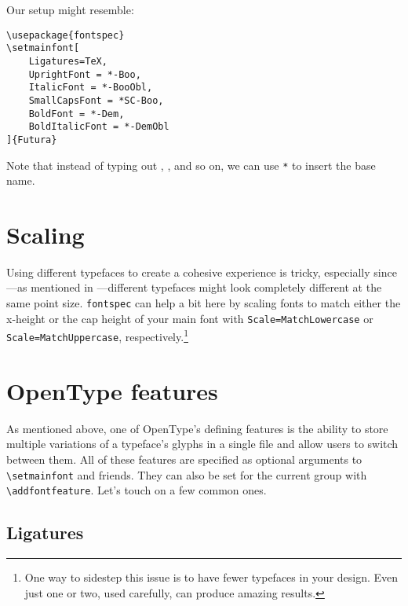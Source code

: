 \newpage
\noindent Our setup might resemble:
\begin{leftfigure}
\begin{lstlisting}
\usepackage{fontspec}
\setmainfont[
    Ligatures=TeX,
    UprightFont = *-Boo,
    ItalicFont = *-BooObl,
    SmallCapsFont = *SC-Boo,
    BoldFont = *-Dem,
    BoldItalicFont = *-DemObl
]{Futura}
\end{lstlisting}
\end{leftfigure}
Note that instead of typing out ,
, and so on, we can use \texttt{*} to insert the base name.

\section{Scaling}

Using different typefaces to create a cohesive experience is tricky,
especially since---as mentioned in ---different typefaces
might look completely different at the same point size.
\texttt{fontspec} can help a bit here by scaling fonts to match either the
x-height or the cap height of your main font with
\verb|Scale=MatchLowercase| or \verb|Scale=MatchUppercase|,
respectively.\footnote{One way to sidestep this issue is to have fewer
typefaces in your design. Even just one or two,
used carefully, can produce amazing results.}


\section{OpenType features}

As mentioned above, one of OpenType's defining features is the ability to store
multiple variations of a typeface's glyphs in a single file and allow users
to switch between them.
All of these features are specified as optional arguments to
\verb|\setmainfont| and friends.
They can also be set for the current group with
\verb|\addfontfeature|.
Let's touch on a few common ones.

\subsection{Ligatures}

